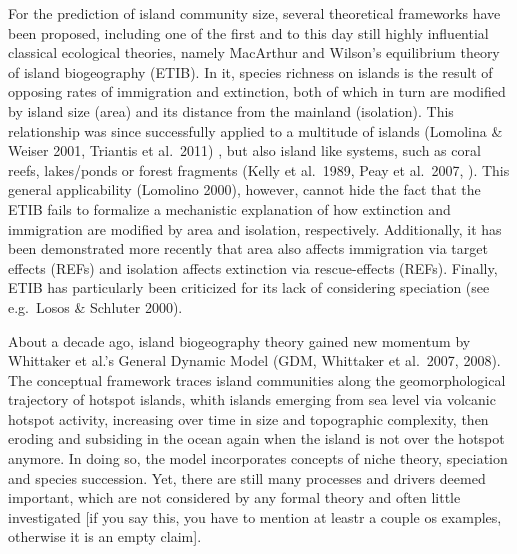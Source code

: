 \documentclass[a4paper]{scrartcl}
\begin{document}
For the prediction of island community size, several theoretical frameworks have been proposed, including one of the first and to this day still highly influential classical ecological theories, namely MacArthur and Wilson's equilibrium theory of island biogeography (ETIB). %
In it, species richness on islands is the result of opposing rates of immigration and extinction, both of which in turn are modified by island size (area) and its distance from the mainland (isolation).
This relationship was since successfully applied to a multitude of islands (Lomolina \& Weiser 2001, Triantis et al.\ 2011)%
, but also island like systems, such as coral reefs, lakes/ponds or forest fragments (Kelly et al.\ 1989, Peay et al.\ 2007, ). %
This general applicability (Lomolino 2000), however, cannot hide the fact that the ETIB fails to formalize a mechanistic explanation of how extinction and immigration are modified by area and isolation, respectively.
Additionally, it has been demonstrated more recently that area also affects immigration via target effects (REFs) and isolation affects extinction via rescue-effects (REFs). Finally, ETIB has particularly been criticized for its lack of considering speciation (see e.g.\ Losos \& Schluter 2000). %

About a decade ago, island biogeography theory gained new momentum by Whittaker et al.'s General Dynamic Model (GDM, Whittaker et al.\ 2007, 2008). %
The conceptual framework traces island communities along the geomorphological trajectory of hotspot islands,
whith islands emerging from sea level via volcanic hotspot activity, increasing over time in size and topographic complexity, then eroding and subsiding in the ocean again when the island is not over the hotspot anymore.
In doing so, the model incorporates concepts of niche theory, speciation and species succession.
Yet, there are still many processes and drivers deemed important, which are not considered by any formal theory and often little investigated [if you say this, you have to mention at leastr a couple os examples, otherwise it is an empty claim].
\end{document}
